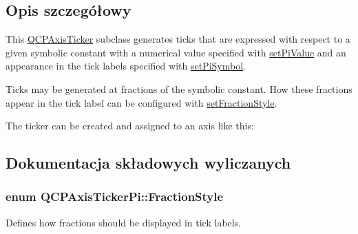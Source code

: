 \subsection{Opis szczegółowy}


This \hyperlink{class_q_c_p_axis_ticker}{Q\+C\+P\+Axis\+Ticker} subclass generates ticks that are expressed with respect to a given symbolic constant with a numerical value specified with \hyperlink{class_q_c_p_axis_ticker_pi_a36ce0651d2ec92edd36feac1619c2468}{set\+Pi\+Value} and an appearance in the tick labels specified with \hyperlink{class_q_c_p_axis_ticker_pi_acfdcd4758a393bde4be12a50fb2017b5}{set\+Pi\+Symbol}.

Ticks may be generated at fractions of the symbolic constant. How these fractions appear in the tick label can be configured with \hyperlink{class_q_c_p_axis_ticker_pi_a760c8af6ca68178e607556c4e5049d71}{set\+Fraction\+Style}.

The ticker can be created and assigned to an axis like this\+: 
\begin{DoxyCodeInclude}
\end{DoxyCodeInclude}


\subsection{Dokumentacja składowych wyliczanych}
\subsubsection[{\texorpdfstring{Fraction\+Style}{FractionStyle}}]{\setlength{\rightskip}{0pt plus 5cm}enum {\bf Q\+C\+P\+Axis\+Ticker\+Pi\+::\+Fraction\+Style}}\hypertarget{class_q_c_p_axis_ticker_pi_a262f1534c7f0c79a7d5237f5d1e2c54c}{}\label{class_q_c_p_axis_ticker_pi_a262f1534c7f0c79a7d5237f5d1e2c54c}
Defines how fractions should be displayed in tick labels.

